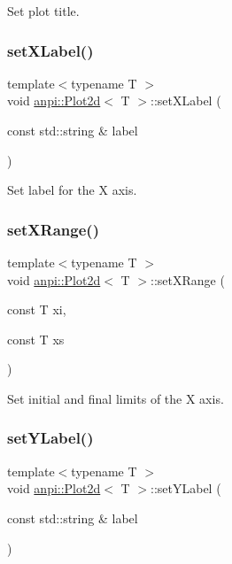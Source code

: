 Set plot title. 

\mbox{\label{classanpi_1_1Plot2d_a64b1163ea264ff3eec9f222d82b92052}} 
\subsubsection{\texorpdfstring{set\+X\+Label()}{setXLabel()}}
{\footnotesize\ttfamily template$<$typename T $>$ \\
void \hyperlink{classanpi_1_1Plot2d}{anpi\+::\+Plot2d}$<$ T $>$\+::set\+X\+Label (\begin{DoxyParamCaption}\item[{const std\+::string \&}]{label }\end{DoxyParamCaption})}



Set label for the X axis. 

\mbox{\label{classanpi_1_1Plot2d_aad762639127c43070ba584a3c438cf52}} 
\subsubsection{\texorpdfstring{set\+X\+Range()}{setXRange()}}
{\footnotesize\ttfamily template$<$typename T $>$ \\
void \hyperlink{classanpi_1_1Plot2d}{anpi\+::\+Plot2d}$<$ T $>$\+::set\+X\+Range (\begin{DoxyParamCaption}\item[{const T}]{xi,  }\item[{const T}]{xs }\end{DoxyParamCaption})}



Set initial and final limits of the X axis. 

\mbox{\label{classanpi_1_1Plot2d_a689b16faa995ca545fe13088cbd382a5}} 
\subsubsection{\texorpdfstring{set\+Y\+Label()}{setYLabel()}}
{\footnotesize\ttfamily template$<$typename T $>$ \\
void \hyperlink{classanpi_1_1Plot2d}{anpi\+::\+Plot2d}$<$ T $>$\+::set\+Y\+Label (\begin{DoxyParamCaption}\item[{const std\+::string \&}]{label }\end{DoxyParamCaption})}



